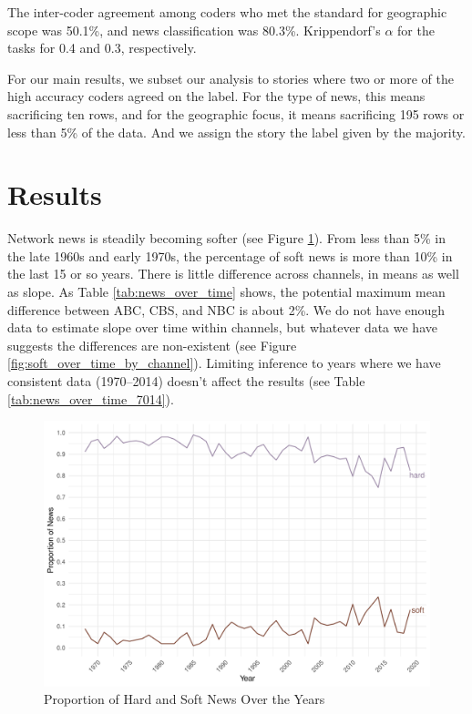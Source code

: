 \documentclass[12pt, letterpaper]{article}
\begin{document}
The inter-coder agreement among coders who met the standard for geographic scope was 50.1\%, and news classification was 80.3\%. Krippendorf's $\alpha$ for the tasks for 0.4 and 0.3, respectively.

For our main results, we subset our analysis to stories where two or more of the high accuracy coders agreed on the label. For the type of news, this means sacrificing ten rows, and for the geographic focus, it means sacrificing 195 rows or less than 5\% of the data. And we assign the story the label given by the majority.

\section*{Results}
Network news is steadily becoming softer (see Figure \ref{fig:soft_over_time}). From less than 5\% in the late 1960s and early 1970s, the percentage of soft news is more than 10\% in the last 15 or so years. There is little difference across channels, in means as well as slope. As Table \ref{tab:news_over_time} shows, the potential maximum mean difference between ABC, CBS, and NBC is about 2\%. We do not have enough data to estimate slope over time within channels, but whatever data we have suggests the differences are non-existent (see Figure \ref{fig:soft_over_time_by_channel}). Limiting inference to years where we have consistent data (1970--2014) doesn't affect the results (see Table \ref{tab:news_over_time_7014}).

\begin{figure}[H]
  \centering
  \includegraphics[width=.95\linewidth]{../figs/fig_prob_news_all.pdf}
  \caption{Proportion of Hard and Soft News Over the Years}
  \label{fig:soft_over_time}
\end{figure}
\end{document}
